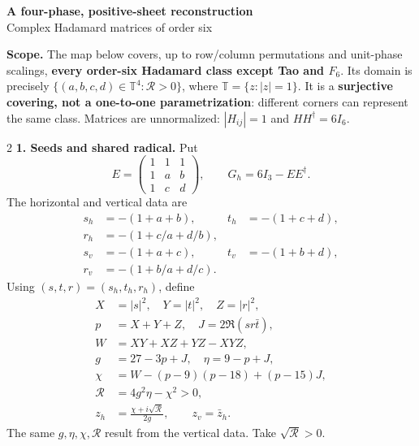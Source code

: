 \documentclass[10pt]{article}
\newcommand{\T}{\mathbb T}
\newcommand{\R}{\mathcal R}
\begin{document}
\begin{center}
{\Large\bfseries A four-phase, positive-sheet reconstruction}\\[3pt]
{\normalsize Complex Hadamard matrices of order six}
\end{center}
\textbf{Scope.} The map below covers, up to row/column permutations and unit-phase scalings, \textbf{every order-six Hadamard class except Tao and $F_6$}. Its domain is precisely
$\{(a,b,c,d)\in\T^4:\R>0\}$, where $\T=\{z:|z|=1\}$.
It is a \textbf{surjective covering, not a one-to-one parametrization}: different corners can represent the same class. Matrices are unnormalized: $|H_{ij}|=1$ and $HH^\dagger=6I_6$.

\begin{multicols}{2}
\textbf{1. Seeds and shared radical.} Put
\[
E=\begin{pmatrix}1&1&1\\1&a&b\\1&c&d\end{pmatrix},\qquad
G_h=6I_3-EE^\dagger.
\]
The horizontal and vertical data are
\[
\begin{aligned}
s_h&=-(1+a+b),&t_h&=-(1+c+d),\\
r_h&=-(1+c/a+d/b),\\
s_v&=-(1+a+c),&t_v&=-(1+b+d),\\
r_v&=-(1+b/a+d/c).
\end{aligned}
\]
Using $(s,t,r)=(s_h,t_h,r_h)$, define
\[
\begin{aligned}
X&=|s|^2,\quad Y=|t|^2,\quad Z=|r|^2,\\
p&=X+Y+Z,\quad J=2\Re(sr\bar t),\\
W&=XY+XZ+YZ-XYZ,\\
g&=27-3p+J,\quad \eta=9-p+J,\\
\chi&=W-(p-9)(p-18)+(p-15)J,\\
\R&=4g^2\eta-\chi^2>0,\\
z_h&=\frac{\chi+i\sqrt{\R}}{2g},\qquad z_v=\bar z_h.
\end{aligned}
\]
The same $g,\eta,\chi,\R$ result from the vertical data. Take $\sqrt{\R}>0$.


\end{multicols}
\end{document}
